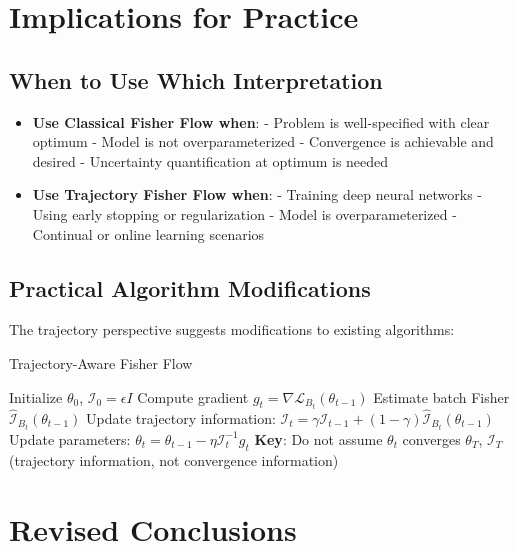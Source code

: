 \documentclass[11pt]{article}
\begin{document}
\section*{Implications for Practice}

\subsection*{When to Use Which Interpretation}

\begin{itemize}
\item \textbf{Use Classical Fisher Flow when}:
  - Problem is well-specified with clear optimum
  - Model is not overparameterized  
  - Convergence is achievable and desired
  - Uncertainty quantification at optimum is needed

\item \textbf{Use Trajectory Fisher Flow when}:
  - Training deep neural networks
  - Using early stopping or regularization
  - Model is overparameterized
  - Continual or online learning scenarios
\end{itemize}

\subsection*{Practical Algorithm Modifications}

The trajectory perspective suggests modifications to existing algorithms:

\begin{algorithm}[h]
\caption{Trajectory-Aware Fisher Flow}
\begin{algorithmic}[1]
\State Initialize $\theta_0$, $\mathcal{I}_0 = \epsilon I$
    \State Compute gradient $g_t = \nabla \mathcal{L}_{B_t}(\theta_{t-1})$
    \State Estimate batch Fisher $\hat{\mathcal{I}}_{B_t}(\theta_{t-1})$
    \State Update trajectory information:
    \State \quad $\mathcal{I}_t = \gamma \mathcal{I}_{t-1} + (1-\gamma) \hat{\mathcal{I}}_{B_t}(\theta_{t-1})$
    \State Update parameters:
    \State \quad $\theta_t = \theta_{t-1} - \eta \mathcal{I}_t^{-1} g_t$
    \State \textbf{Key}: Do not assume $\theta_t$ converges
\EndFor
\Return $\theta_T$, $\mathcal{I}_T$ (trajectory information, not convergence information)
\end{algorithmic}
\end{algorithm}

\section*{Revised Conclusions}
\end{document}
